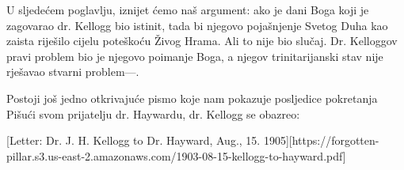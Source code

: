 U sljedećem poglavlju, iznijet ćemo naš argument: ako je dani  Boga koji je zagovarao dr. Kellogg bio istinit, tada bi njegovo pojašnjenje Svetog Duha kao  zaista riješilo cijelu poteškoću Živog Hrama. Ali to nije bio slučaj. Dr. Kelloggov pravi problem bio je njegovo poimanje Boga, a njegov trinitarijanski stav nije rješavao stvarni problem—.

Postoji još jedno otkrivajuće pismo koje nam pokazuje posljedice pokretanja  Pišući svom prijatelju dr. Haywardu, dr. Kellogg se obazreo:


[Letter: Dr. J. H. Kellogg to Dr. Hayward, Aug., 15. 1905][https://forgotten-pillar.s3.us-east-2.amazonaws.com/1903-08-15-kellogg-to-hayward.pdf]

